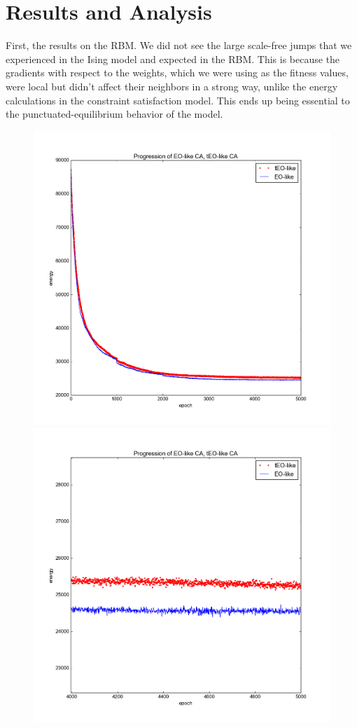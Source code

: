 \documentclass[12pt]{article}
\begin{document}
\section{Results and Analysis}
First, the results on the RBM. We did not see the large scale-free jumps that we experienced in the Ising model and expected in the RBM. This is because the gradients with respect to the weights, which we were using as the fitness values, were local but didn't affect their neighbors in a strong way, unlike the energy calculations in the constraint satisfaction model. This ends up being essential to the punctuated-equilibrium behavior of the model.

\begin{figure}
  \includegraphics{eo_rbm_unzoomed}
  \includegraphics{eo_rbm_zoomed}
\end{figure}
\end{document}

